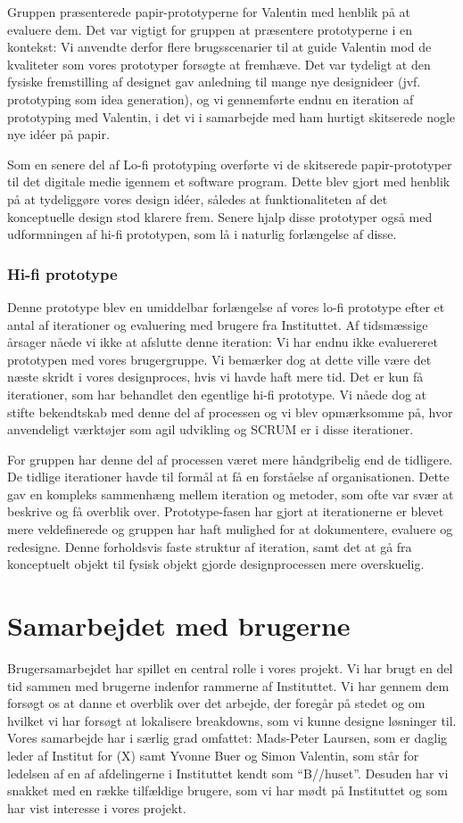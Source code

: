 Gruppen præsenterede papir-prototyperne for Valentin med henblik på at evaluere dem. Det var vigtigt for gruppen at præsentere prototyperne i en kontekst: Vi anvendte derfor flere brugsscenarier til at guide Valentin mod de kvaliteter som vores prototyper forsøgte at fremhæve. Det var tydeligt at den fysiske fremstilling af designet gav anledning til mange nye designideer (jvf. prototyping som idea generation), og vi gennemførte endnu en iteration af prototyping med Valentin, i det vi i samarbejde med ham hurtigt skitserede nogle nye idéer på papir.

Som en senere del af Lo-fi prototyping overførte vi de skitserede papir-prototyper til det digitale medie igennem et software program. Dette blev gjort med henblik på at tydeliggøre vores design idéer, således at funktionaliteten af det konceptuelle design stod klarere frem. Senere hjalp disse prototyper også med udformningen af hi-fi prototypen, som lå i naturlig forlængelse af disse.

\subsubsection{Hi-fi prototype}
Denne prototype blev en umiddelbar forlængelse af vores lo-fi prototype efter et antal af iterationer og evaluering med brugere fra Instituttet. Af tidsmæssige årsager nåede vi ikke at afslutte
denne iteration: Vi har endnu ikke evaluereret prototypen med vores brugergruppe. Vi bemærker dog at dette ville være det næste skridt i vores designproces, hvis vi havde haft mere tid.
Det er kun få iterationer, som har behandlet den egentlige hi-fi prototype. Vi nåede dog at stifte bekendtskab med denne del af processen og vi blev opmærksomme på, hvor anvendeligt værktøjer som agil udvikling og SCRUM er i disse iterationer.

For gruppen har denne del af processen været mere håndgribelig end de tidligere. De tidlige iterationer havde til formål at få en forståelse af organisationen. Dette gav en kompleks sammenhæng mellem iteration og metoder, som ofte var svær at beskrive og få overblik over. Prototype-fasen har gjort at iterationerne er blevet mere veldefinerede og gruppen har haft mulighed for at dokumentere, evaluere og redesigne. Denne forholdsvis faste struktur af iteration, samt det at gå fra konceptuelt objekt til fysisk objekt gjorde designprocessen mere overskuelig. 

\section{Samarbejdet med brugerne}
Brugersamarbejdet har spillet en central rolle i vores projekt. Vi har brugt en del tid sammen med brugerne indenfor rammerne af Instituttet. Vi har gennem dem forsøgt os at danne et overblik over det arbejde, der foregår på stedet og om hvilket vi har forsøgt at lokalisere breakdowns, som vi kunne designe løsninger til.
Vores samarbejde har i særlig grad omfattet: Mads-Peter Laursen, som er daglig leder af Institut for (X) samt Yvonne Buer og Simon Valentin, som står for ledelsen af en af afdelingerne i Instituttet kendt som “B//huset”. Desuden har vi snakket med en række tilfældige brugere, som vi har mødt på Instituttet og som har vist interesse i vores projekt.

